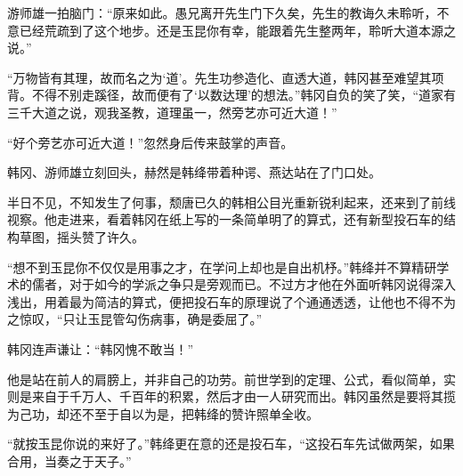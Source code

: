 游师雄一拍脑门：“原来如此。愚兄离开先生门下久矣，先生的教诲久未聆听，不意已经荒疏到了这个地步。还是玉昆你有幸，能跟着先生整两年，聆听大道本源之说。”

“万物皆有其理，故而名之为‘道’。先生功参造化、直透大道，韩冈甚至难望其项背。不得不别走蹊径，故而便有了‘以数达理’的想法。”韩冈自负的笑了笑，“道家有三千大道之说，观我圣教，道理虽一，然旁艺亦可近大道！”

“好个旁艺亦可近大道！”忽然身后传来鼓掌的声音。

韩冈、游师雄立刻回头，赫然是韩绛带着种谔、燕达站在了门口处。

半日不见，不知发生了何事，颓唐已久的韩相公目光重新锐利起来，还来到了前线视察。他走进来，看着韩冈在纸上写的一条简单明了的算式，还有新型投石车的结构草图，摇头赞了许久。

“想不到玉昆你不仅仅是用事之才，在学问上却也是自出机杼。”韩绛并不算精研学术的儒者，对于如今的学派之争只是旁观而已。不过方才他在外面听韩冈说得深入浅出，用着最为简洁的算式，便把投石车的原理说了个通通透透，让他也不得不为之惊叹，“只让玉昆管勾伤病事，确是委屈了。”

韩冈连声谦让：“韩冈愧不敢当！”

他是站在前人的肩膀上，并非自己的功劳。前世学到的定理、公式，看似简单，实则是来自于千万人、千百年的积累，然后才由一人研究而出。韩冈虽然是要将其揽为己功，却还不至于自以为是，把韩绛的赞许照单全收。

“就按玉昆你说的来好了。”韩绛更在意的还是投石车，“这投石车先试做两架，如果合用，当奏之于天子。”

